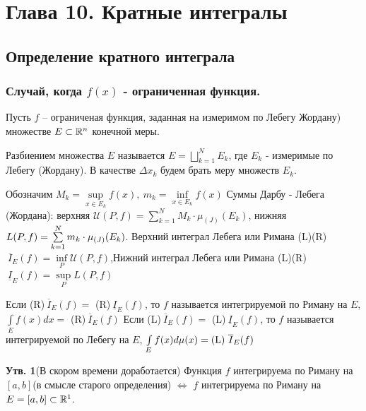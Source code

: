 \setcounter{section}{9}
\section{Глава 10. Кратные интегралы}
\subsection{Определение кратного интеграла}
\subsubsection{Случай, когда $f(x)$ - ограниченная функция.}
\begin{Def}
Пусть $f$ -- ограниченая функция, заданная на измеримом по Лебегу Жордану) множестве $E \subset \R^n$ конечной меры. 

$\textbf{Разбиением}$ множества $E$ называется $E=\bigsqcup\limits_{k=1}^N E_k$, где $E_k$ - измеримые по Лебегу (Жордану). \newline В качестве $\Delta x_k$ будем брать меру множеств $E_k$. 

Обозначим $M_k=\sup\limits_{x\in E_k} f\left(x\right) ,\  m_k=\inf\limits_{x\in E_k}f\left(x\right)$ \newline
Суммы Дарбу - Лебега (Жордана): верхняя $\mathcal{U}(P, f)=\sum\limits_{k=1}^N M_k \cdot \mu_{(J)}(E_k)$, нижняя $L(P, f)\?=\sum\limits_{k=1}^N m_k \cdot \mu_{(J)}(E_k)$.
\newline Верхний интеграл Лебега или Римана (L)(R)$\ \overline{I}_E(f)=\inf\limits_P \mathcal{U}(P, f)$,\newline Нижний интеграл Лебега или Римана (L)(R)$\ \underline{I}_E(f)=\sup\limits_P L(P, f)$
\end{Def}
\begin{Def}
Если (R)$\ \overline{I}_E(f)=$ (R)$\ \underline{I}_E(f)$, то $f$ называется интегрируемой по Риману на $E$, $\int\limits_E f(x)dx=$ (R)$\ \overline{I}_E(f)$ \newline
Если (L)$\ \overline{I}_E(f)=$ (L)$\ \underline{I}_E(f)$, то $f$ называется интегрируемой по Лебегу на $E$, $\int\limits_E f(x)d\mu (x)\?= \text{(L) }\overline{I}_E(f)$
\end{Def}
\textbf{Утв. 1}(В скором времени доработается) Функция $f$ интегрируема по Риману на $[a,b]$(в смысле старого определения) $\Leftrightarrow$ $f$ интегрируема по Риману на $E=[a,b] \subset \R^1$.

